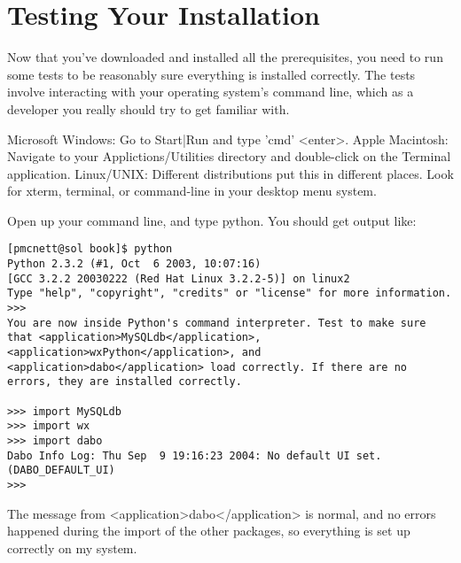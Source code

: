 \section{Testing Your Installation}

Now that you've downloaded and installed all the prerequisites, you need to run some tests to be reasonably sure everything is installed correctly. The tests involve interacting with your operating system's command line, which as a developer you really should try to get familiar with.

Microsoft Windows: Go to Start|Run and type 'cmd' <enter>.
Apple Macintosh: Navigate to your Applictions/Utilities directory and double-click on the Terminal application.
Linux/UNIX: Different distributions put this in different places. Look for xterm, terminal, or command-line in your desktop menu system.
	
Open up your command line, and type python. You should get output like:	%
\begin{verbatim}
[pmcnett@sol book]$ python
Python 2.3.2 (#1, Oct  6 2003, 10:07:16)
[GCC 3.2.2 20030222 (Red Hat Linux 3.2.2-5)] on linux2
Type "help", "copyright", "credits" or "license" for more information.
>>>
You are now inside Python's command interpreter. Test to make sure that <application>MySQLdb</application>, <application>wxPython</application>, and <application>dabo</application> load correctly. If there are no errors, they are installed correctly.

>>> import MySQLdb
>>> import wx
>>> import dabo
Dabo Info Log: Thu Sep  9 19:16:23 2004: No default UI set. (DABO_DEFAULT_UI)
>>>
\end{verbatim}
The message from <application>dabo</application> is normal, and no errors happened during the import of the other packages, so everything is set up correctly on my system. 